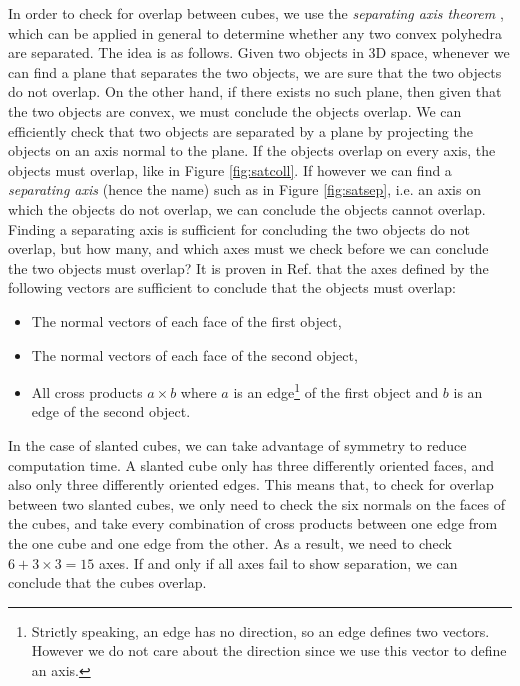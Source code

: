 \documentclass[thesis]{subfiles}
\begin{document}
In order to check for overlap between cubes, we use the \emph{separating axis theorem} \cite{gottschalk1996separating}, which can be applied in general to determine whether any two convex polyhedra are separated. The idea is as follows. Given two objects in 3D space, whenever we can find a plane that separates the two objects, we are sure that the two objects do not overlap. On the other hand, if there exists no such plane, then given that the two objects are convex, we must conclude the objects overlap. We can efficiently check that two objects are separated by a plane by projecting the objects on an axis normal to the plane. If the objects overlap on every axis, the objects must overlap, like in Figure \ref{fig:satcoll}. If however we can find a \emph{separating axis} (hence the name) such as in Figure \ref{fig:satsep}, i.e. an axis on which the objects do not overlap, we can conclude the objects cannot overlap.
\\
Finding a separating axis is sufficient for concluding the two objects do not overlap, but how many, and which axes must we check before we can conclude the two objects must overlap? It is proven in Ref. \cite{gottschalk1996separating}  that the axes defined by the following vectors are sufficient to conclude that the objects must overlap:
\begin{itemize}
	\item The normal vectors of each face of the first object,
	\item The normal vectors of each face of the second object,
	\item All cross products $a \times b$ where $a$ is an edge\footnote{Strictly speaking, an edge has no direction, so an edge defines two vectors. However we do not care about the direction since we use this vector to define an axis.} of the first object and $b$ is an edge of the second object.
\end{itemize}

In the case of slanted cubes, we can take advantage of symmetry to reduce computation time. A slanted cube only has three differently oriented faces, and also only three differently oriented edges. This means that, to check for overlap between two slanted cubes, we only need to check the six normals on the faces of the cubes, and take every combination of cross products between one edge from the one cube and one edge from the other. As a result, we need to check $6 + 3 \times 3 = 15$ axes. If and only if all axes fail to show separation, we can conclude that the cubes overlap.
\end{document}
